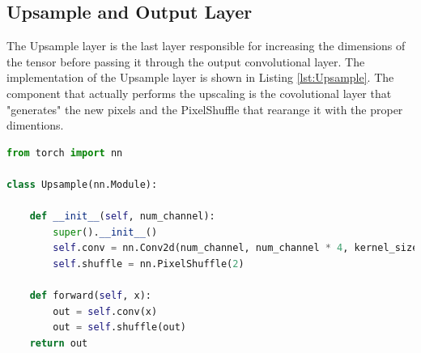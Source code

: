 \documentclass[../report.tex]{subfiles}
\begin{document}
\subsection{Upsample and Output Layer}
The Upsample layer is the last layer responsible for increasing the dimensions of the tensor before passing it through the output convolutional layer. The implementation of the Upsample layer is shown in Listing \ref{lst:Upsample}. The component that actually performs the upscaling is the covolutional layer that "generates" the new pixels and the PixelShuffle that rearange it with the proper dimentions.

\begin{lstlisting}[style=python, language=python, label={lst:Upsample}, caption={Upsample implementation}]
from torch import nn
	
class Upsample(nn.Module):
	
	def __init__(self, num_channel):
		super().__init__()
		self.conv = nn.Conv2d(num_channel, num_channel * 4, kernel_size=3, padding=1)
		self.shuffle = nn.PixelShuffle(2)
	
	def forward(self, x):
		out = self.conv(x)
		out = self.shuffle(out)
	return out
\end{lstlisting}
\end{document}
